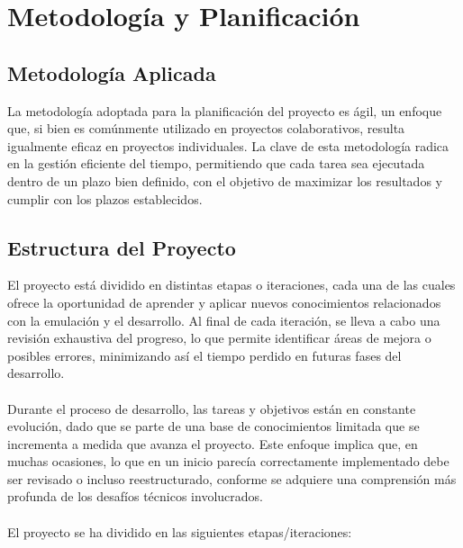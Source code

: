 \cleardoublepage

\chapter{Metodología y Planificación}
\label{planificacion}
\section{Metodología Aplicada}
La metodología adoptada para la planificación del proyecto es ágil, un enfoque que, si bien es comúnmente utilizado en proyectos colaborativos, resulta igualmente eficaz en proyectos individuales. La clave de esta metodología radica en la gestión eficiente del tiempo, permitiendo que cada tarea sea ejecutada dentro de un plazo bien definido, con el objetivo de maximizar los resultados y cumplir con los plazos establecidos.
\section{Estructura del Proyecto}
El proyecto está dividido en distintas etapas o iteraciones, cada una de las cuales ofrece la oportunidad de aprender y aplicar nuevos conocimientos relacionados con la emulación y el desarrollo. Al final de cada iteración, se lleva a cabo una revisión exhaustiva del progreso, lo que permite identificar áreas de mejora o posibles errores, minimizando así el tiempo perdido en futuras fases del desarrollo.
\\\\
Durante el proceso de desarrollo, las tareas y objetivos están en constante evolución, dado que se parte de una base de conocimientos limitada que se incrementa a medida que avanza el proyecto. Este enfoque implica que, en muchas ocasiones, lo que en un inicio parecía correctamente implementado debe ser revisado o incluso reestructurado, conforme se adquiere una comprensión más profunda de los desafíos técnicos involucrados.
\\\\
El proyecto se ha dividido en las siguientes etapas/iteraciones:

